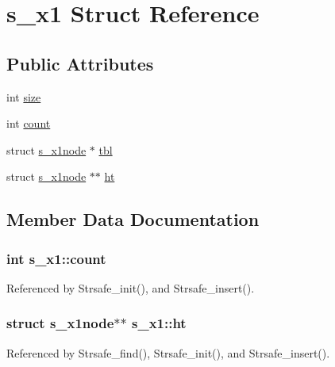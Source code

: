 \hypertarget{structs__x1}{\section{s\-\_\-x1 Struct Reference}
\label{structs__x1}
}
\subsection*{Public Attributes}
\begin{DoxyCompactItemize}
\item 
int \hyperlink{structs__x1_ae410b4957e3cad477a2d307481fa1293}{size}
\item 
int \hyperlink{structs__x1_a6caa9df6ff72618f02a7128680d1a88d}{count}
\item 
struct \hyperlink{structs__x1node}{s\-\_\-x1node} $\ast$ \hyperlink{structs__x1_a292e56fd839ec5f7b9a61efe74a543f0}{tbl}
\item 
struct \hyperlink{structs__x1node}{s\-\_\-x1node} $\ast$$\ast$ \hyperlink{structs__x1_abbab5736bb3954bbba08fa6fad6a1534}{ht}
\end{DoxyCompactItemize}


\subsection{Member Data Documentation}
\hypertarget{structs__x1_a6caa9df6ff72618f02a7128680d1a88d}{
\subsubsection[{count}]{\setlength{\rightskip}{0pt plus 5cm}int s\-\_\-x1\-::count}}\label{structs__x1_a6caa9df6ff72618f02a7128680d1a88d}


Referenced by Strsafe\-\_\-init(), and Strsafe\-\_\-insert().

\hypertarget{structs__x1_abbab5736bb3954bbba08fa6fad6a1534}{
\subsubsection[{ht}]{\setlength{\rightskip}{0pt plus 5cm}struct {\bf s\-\_\-x1node}$\ast$$\ast$ s\-\_\-x1\-::ht}}\label{structs__x1_abbab5736bb3954bbba08fa6fad6a1534}


Referenced by Strsafe\-\_\-find(), Strsafe\-\_\-init(), and Strsafe\-\_\-insert().

